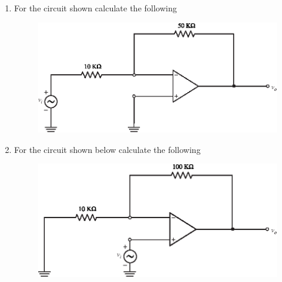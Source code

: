 \begin{enumerate}
\renewcommand{\labelenumi}{\bf\theenumi.}
\item For the circuit shown calculate the following
\begin{figure}[H]
\centering
\includegraphics{addfig/exr5.1.eps}
\end{figure}

\item For the circuit shown below calculate the following
\medskip
\begin{figure}[H]
\centering
\includegraphics{addfig/exr5.2.eps}
\end{figure}


\end{enumerate}
